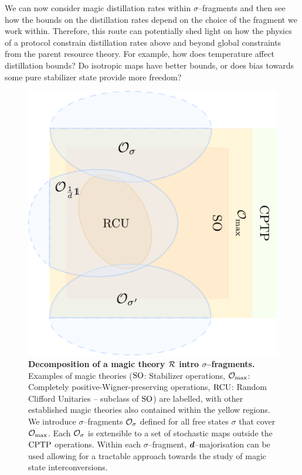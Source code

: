 \documentclass[pra,
aps,
twocolumn,
superscriptaddress,
groupedaddress,
nofootinbib,
reprint
]{revtex4-1}
\begin{document}
We can now consider magic distillation rates within $\sigma$--fragments and then see how the bounds on the distillation rates depend on the choice of the fragment we work within. Therefore, this route can potentially shed light on how the physics of a protocol constrain distillation rates above and beyond global constraints from the parent resource theory. For example, how does temperature affect distillation bounds? Do isotropic maps have better bounds, or does bias towards some pure stabilizer state provide more freedom?

\begin{figure}[t]
    \centering
        \includegraphics[scale=0.3
        ]{figs/operations.pdf}
    \caption{\textbf{Decomposition of a magic theory $\mathcal{R}$ intro $\sigma$--fragments.} 
	Examples of magic theories (${\rm{SO}}$: Stabilizer operations, $\mathcal{O}_{\rm{max}}$: Completely positive-Wigner-preserving operations, ${\rm{RCU}}$: Random Clifford Unitaries -- subclass of ${\rm{SO}}$) are labelled, with other established magic theories also contained within the yellow regions.
    We introduce $\sigma$--fragments $\mathcal{O}_\sigma$ defined for all free states $\sigma$ that cover $\mathcal{O}_{\rm{max}}$. 
    Each $\mathcal{O}_\sigma$ is extensible to a set of stochastic maps outside the ${\rm{CPTP}}$ operations.
    Within each $\sigma$--fragment, $\bm{d}$--majorisation can be used allowing for a tractable approach towards the study of magic state interconversions.
    }
    \label{fig:zoo}
\end{figure}
\end{document}

